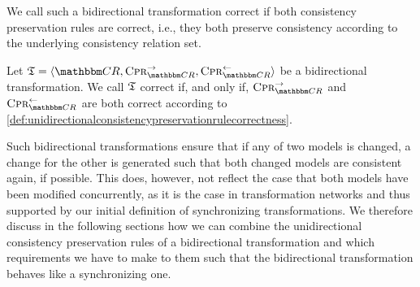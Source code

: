 We call such a bidirectional transformation correct if both consistency preservation rules are correct, i.e., they both preserve consistency according to the underlying consistency relation set.

\begin{definition}
    \label{def:bidirectionaltransformationcorrectness}
    Let $\transformation{T} = \tupled{\consistencyrelationset{CR}, \consistencypreservationrule{\consistencyrelationset{CR}}^{\rightarrow}, \consistencypreservationrule{\consistencyrelationset{CR}}^{\leftarrow}}$ be a bidirectional transformation.
    We call $\mathfrak{T}$ correct if, and only if, $\consistencypreservationrule{\consistencyrelationset{CR}}^{\rightarrow}$ and $\consistencypreservationrule{\consistencyrelationset{CR}}^{\leftarrow}$ are both correct according to \autoref{def:unidirectionalconsistencypreservationrulecorrectness}.
\end{definition}

Such bidirectional transformations ensure that if any of two models is changed, a change for the other is generated such that both changed models are consistent again, if possible.
This does, however, not reflect the case that both models have been modified concurrently, as it is the case in transformation networks and thus supported by our initial definition of synchronizing transformations.
We therefore discuss in the following sections how we can combine the unidirectional consistency preservation rules of a bidirectional transformation and which requirements we have to make to them such that the bidirectional transformation behaves like a synchronizing one.

